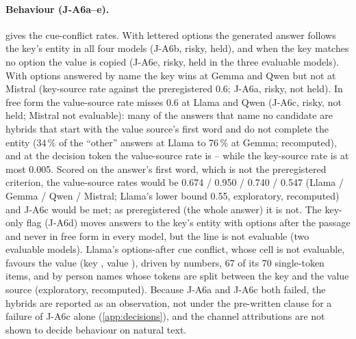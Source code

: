 \paragraph{Behaviour (J-A6a--e).}  gives the cue-conflict rates. With lettered options the generated answer follows the key's entity in all four models (J-A6b, risky, held), and when the key matches no option the value is copied (J-A6e, risky, held in the three evaluable models). With options answered by name the key wins at Gemma and Qwen but not at Mistral (key-source rate \JaKeySrcOptaMistralSeven{} against the preregistered 0.6; J-A6a, risky, not held). In free form the value-source rate misses 0.6 at Llama and Qwen (J-A6c, risky, not held; Mistral not evaluable): many of the answers that name no candidate are hybrids that start with the value source's first word and do not complete the entity (34\,\% of the ``other'' answers at Llama to 76\,\% at Gemma; recomputed), and at the decision token the value-source rate is \JaValSrcDecNomMin{}--\JaValSrcDecNomMax{} while the key-source rate is at most 0.005. Scored on the answer's first word, which is not the preregistered criterion, the value-source rates would be 0.674 / 0.950 / 0.740 / 0.547 (Llama / Gemma / Qwen / Mistral; Llama's lower bound 0.55, exploratory, recomputed) and J-A6c would be met; as preregistered (the whole answer) it is not. The key-only flag (J-A6d) moves answers to the key's entity with options after the passage and never in free form in every model, but the line is not evaluable (two evaluable models). Llama's options-after cue conflict, whose cell is not evaluable, favours the value (key \JaKeySrcOptaLlamaEight{}, value \JaValSrcOptaLlamaEight{}), driven by numbers, 67 of its 70 single-token items, and by person names whose tokens are split between the key and the value source (exploratory, recomputed). Because J-A6a and J-A6c both failed, the hybrids are reported as an observation, not under the pre-written clause for a failure of J-A6c alone (\cref{app:decisions}), and the channel attributions are not shown to decide behaviour on natural text. %

